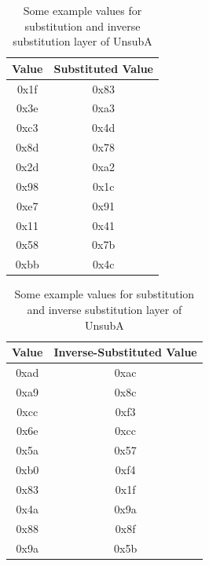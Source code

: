 \documentclass[12pt,a4paper]{article}
\begin{document}
\begin{table}[P]
\centering
\begin{subtable}[b]{\textwidth}
    \centering
    \begin{tabular}{|c||c|}
    \hline
    Value & Substituted Value \\ \hline \hline
    0x1f & 0x83 \\ \hline
    0x3e & 0xa3 \\ \hline
    0xc3 & 0x4d \\ \hline
    0x8d & 0x78 \\ \hline
    0x2d & 0xa2 \\ \hline
    0x98 & 0x1c \\ \hline
    0xe7 & 0x91 \\ \hline
    0x11 & 0x41 \\ \hline
    0x58 & 0x7b \\ \hline
    0xbb & 0x4c \\ \hline
    \end{tabular}
    \caption{Substituted Values}
\end{subtable}
\begin{subtable}[b]{\textwidth}
    \centering
    \begin{tabular}{|c||c|} 
    \hline
    Value & Inverse-Substituted Value \\ \hline \hline
        0xad & 0xac \\ \hline
        0xa9 & 0x8c \\ \hline
        0xcc & 0xf3 \\ \hline
        0x6e & 0xcc \\ \hline
        0x5a & 0x57 \\ \hline
        0xb0 & 0xf4 \\ \hline
        0x83 & 0x1f \\ \hline
        0x4a & 0x9a \\ \hline
        0x88 & 0x8f \\ \hline
        0x9a & 0x5b \\ \hline
    \end{tabular}
    \caption{Inverse Substituted Values}
\end{subtable}
\caption[Substitution Layer Example Values for UnsubA]{Some example values for
substitution and inverse substitution layer of UnsubA}
\label{tab:sub_example}
\end{table}
\end{document}
